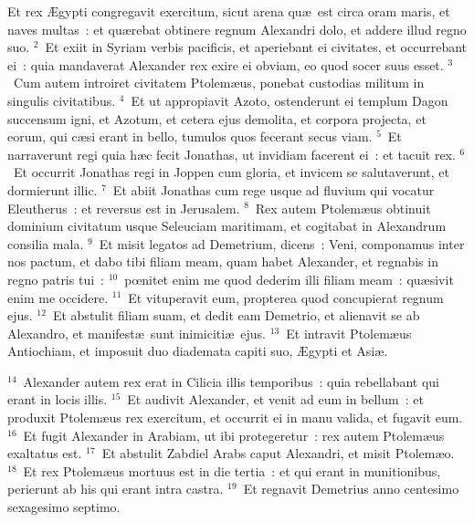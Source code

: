 \lettrine[lines=3,image=true,loversize=0.05,lraise=-0.03]{E}{}t rex \AE gypti congregavit exercitum, sicut arena qu\ae\ est circa oram maris, et naves multas~: et qu\ae rebat obtinere regnum Alexandri dolo, et addere illud regno suo.
${}^{2}$~Et exiit in Syriam verbis pacificis, et aperiebant ei civitates, et occurrebant ei~: quia mandaverat Alexander rex exire ei obviam, eo quod socer suus esset.
${}^{3}$~Cum autem introiret civitatem Ptolem\ae us, ponebat custodias militum in singulis civitatibus.
${}^{4}$~Et ut appropiavit Azoto, ostenderunt ei templum Dagon succensum igni, et Azotum, et cetera ejus demolita, et corpora projecta, et eorum, qui c\ae si erant in bello, tumulos quos fecerant secus viam.
${}^{5}$~Et narraverunt regi quia h\ae c fecit Jonathas, ut invidiam facerent ei~: et tacuit rex.
${}^{6}$~Et occurrit Jonathas regi in Joppen cum gloria, et invicem se salutaverunt, et dormierunt illic.
${}^{7}$~Et abiit Jonathas cum rege usque ad fluvium qui vocatur Eleutherus~: et reversus est in Jerusalem.
${}^{8}$~Rex autem Ptolem\ae us obtinuit dominium civitatum usque Seleuciam maritimam, et cogitabat in Alexandrum consilia mala.
${}^{9}$~Et misit legatos ad Demetrium, dicens~: Veni, componamus inter nos pactum, et dabo tibi filiam meam, quam habet Alexander, et regnabis in regno patris tui~:
${}^{10}$~pœnitet enim me quod dederim illi filiam meam~: qu\ae sivit enim me occidere.
${}^{11}$~Et vituperavit eum, propterea quod concupierat regnum ejus.
${}^{12}$~Et abstulit filiam suam, et dedit eam Demetrio, et alienavit se ab Alexandro, et manifest\ae\ sunt inimiciti\ae\ ejus.
${}^{13}$~Et intravit Ptolem\ae us Antiochiam, et imposuit duo diademata capiti suo, \AE gypti et Asi\ae .


${}^{14}$~Alexander autem rex erat in Cilicia illis temporibus~: quia rebellabant qui erant in locis illis.
${}^{15}$~Et audivit Alexander, et venit ad eum in bellum~: et produxit Ptolem\ae us rex exercitum, et occurrit ei in manu valida, et fugavit eum.
${}^{16}$~Et fugit Alexander in Arabiam, ut ibi protegeretur~: rex autem Ptolem\ae us exaltatus est.
${}^{17}$~Et abstulit Zabdiel Arabs caput Alexandri, et misit Ptolem\ae o.
${}^{18}$~Et rex Ptolem\ae us mortuus est in die tertia~: et qui erant in munitionibus, perierunt ab his qui erant intra castra.
${}^{19}$~Et regnavit Demetrius anno centesimo sexagesimo septimo.


